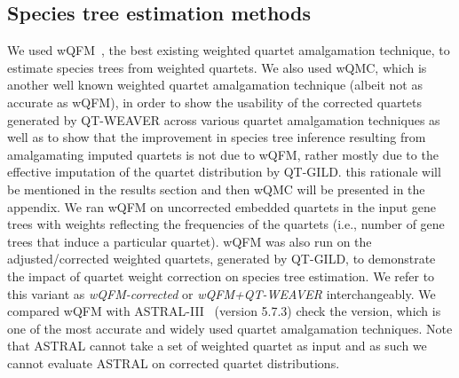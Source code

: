 \documentclass[10pt,a4paper]{article}
\newcommand{\addb}[1]{{\color{red} #1}}
\begin{document}
\subsection{Species tree estimation methods}
We used wQFM~\cite{wqfm}, the best existing weighted quartet amalgamation technique, to estimate species trees from weighted quartets. We also used wQMC, which is another well known weighted quartet amalgamation technique (albeit not as accurate as wQFM), in order to show the usability of the corrected quartets generated by QT-WEAVER across various quartet amalgamation techniques as well as to show that the improvement in species tree inference resulting from amalgamating imputed quartets is not due to wQFM, rather mostly due to the effective imputation of the quartet distribution by QT-GILD. \addb{this rationale will be mentioned in the results section and then wQMC will be presented in the appendix}.
We ran wQFM on uncorrected embedded quartets in the input gene trees with weights reflecting the frequencies of the quartets (i.e., number of gene trees that induce a particular quartet).  
wQFM was also run on the adjusted/corrected weighted quartets, generated by QT-GILD, to demonstrate the impact of quartet weight correction on species tree estimation. We refer to this variant as \textit{wQFM-corrected} or \textit{wQFM+QT-WEAVER} interchangeably. We compared wQFM with ASTRAL-III~\cite{astral,zhang2018astral} (version 5.7.3) \addb{check the version}, which is one of the most accurate and widely used quartet amalgamation techniques. Note that ASTRAL cannot take a set of weighted quartet as input and as such we cannot evaluate ASTRAL on corrected quartet distributions.



 
\end{document}
